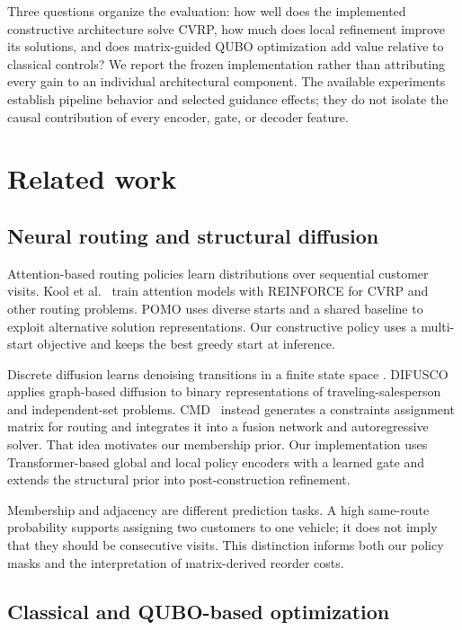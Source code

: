 \documentclass[11pt,a4paper]{article}
\begin{document}
Three questions organize the evaluation: how well does the implemented
constructive architecture solve CVRP, how much does local refinement improve
its solutions, and does matrix-guided QUBO optimization add value relative
to classical controls? We report the frozen implementation rather than
attributing every gain to an individual architectural component. The
available experiments establish pipeline behavior and selected guidance
effects; they do not isolate the causal contribution of every encoder,
gate, or decoder feature.

\section{Related work}
\label{sec:related}

\subsection{Neural routing and structural diffusion}

Attention-based routing policies learn distributions over sequential
customer visits. Kool et al.~\cite{kool2019attention} train attention
models with REINFORCE for CVRP and other routing problems. POMO
\cite{kwon2020pomo} uses diverse starts and a shared baseline to exploit
alternative solution representations. Our constructive policy uses a
multi-start objective and keeps the best greedy start at inference.

Discrete diffusion learns denoising transitions in a finite state space
\cite{austin2021discrete}. DIFUSCO~\cite{sun2023difusco} applies graph-based
diffusion to binary representations of traveling-salesperson and
independent-set problems. CMD~\cite{wang2026cmd} instead generates a
constraints assignment matrix for routing and integrates it into a fusion
network and autoregressive solver. That idea motivates our membership
prior. Our implementation uses Transformer-based global and local policy
encoders with a learned gate and extends the structural prior into
post-construction refinement.

Membership and adjacency are different prediction tasks. A high
same-route probability supports assigning two customers to one vehicle;
it does not imply that they should be consecutive visits. This distinction
informs both our policy masks and the interpretation of matrix-derived
reorder costs.

\subsection{Classical and QUBO-based optimization}
\end{document}
